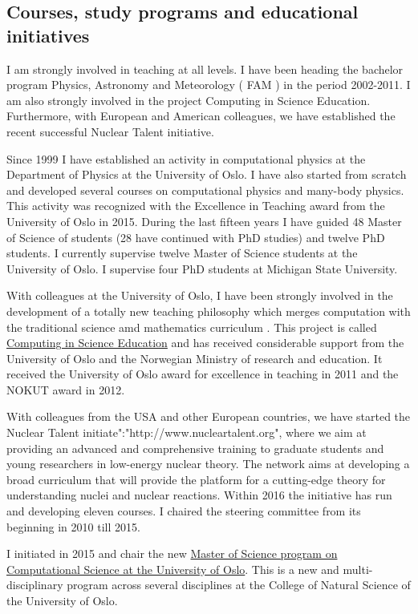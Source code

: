 \documentclass[%
oneside,                 %
final,                   %
10pt]{article}
\begin{document}
\noindent
\subsection*{Courses, study programs and educational initiatives}

I am strongly involved in teaching at all levels. I have been heading the bachelor program Physics, Astronomy and Meteorology ( FAM ) in the period 2002-2011. I am also strongly involved in the project Computing in Science Education. Furthermore, with European and American colleagues, we have established the recent successful Nuclear Talent initiative.

Since 1999 I have   established an activity in computational physics  at the  Department of Physics at the University of Oslo. I have also started from scratch and developed several  courses on computational physics and many-body physics. This activity was recognized with the Excellence in Teaching award from the University of Oslo in 2015. During the last fifteen years I have guided  48 Master of Science of students (28 have continued with PhD studies) and twelve PhD students.  I currently supervise twelve Master of Science students at the University of Oslo. I supervise four PhD students at Michigan State University.

With colleagues at the University of Oslo, I have   been strongly involved in the development of a totally new teaching philosophy which merges computation with the traditional science amd mathematics curriculum . This project is called \href{{http://www.mn.uio.no/english/about/collaboration/cse/}}{Computing in Science Education} and has received considerable support from the University of Oslo and the Norwegian Ministry of research and education.  It received the University of Oslo award for excellence in teaching  in 2011 and the NOKUT award in 2012. 

With colleagues from the USA and other European countries, we have started the Nuclear Talent initiate":"http://www.nucleartalent.org",  where we aim  at providing an advanced and comprehensive training to graduate students and young researchers in low-energy nuclear theory.  The network aims at developing a broad curriculum that will provide the platform for a cutting-edge theory for understanding nuclei and nuclear reactions.  Within 2016 the initiative has run and developing eleven courses. I chaired the steering committee from its beginning in 2010 till 2015. 

I initiated in 2015 and chair the new \href{{http://mhjensen.github.io/CPMLS/doc/pub/Masterprogram/html/Masterprogram.html}}{Master of Science program on Computational Science at the University of Oslo}. This is a new and multi-disciplinary program across several disciplines at the College of Natural Science of the University of Oslo. 
\end{document}
